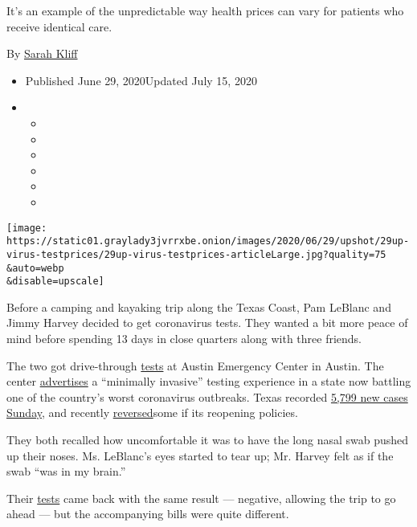 It's an example of the unpredictable way health prices can vary for
patients who receive identical care.

By \href{https://www.nytimes3xbfgragh.onion/by/sarah-kliff}{Sarah Kliff}

\begin{itemize}
\item
  Published June 29, 2020Updated July 15, 2020
\item
  \begin{itemize}
  \item
  \item
  \item
  \item
  \item
  \item
  \end{itemize}
\end{itemize}

\texttt{[image: https://static01.graylady3jvrrxbe.onion/images/2020/06/29/upshot/29up-virus-testprices/29up-virus-testprices-articleLarge.jpg?quality=75\\\&auto=webp\\\&disable=upscale]}

Before a camping and kayaking trip along the Texas Coast, Pam LeBlanc
and Jimmy Harvey decided to get coronavirus tests. They wanted a bit
more peace of mind before spending 13 days in close quarters along with
three friends.

The two got drive-through
\href{https://www.nytimes3xbfgragh.onion/2020/07/15/parenting/kids-covid-19-test.html}{tests}
at Austin Emergency Center in Austin. The center
\href{https://www.austinemergencycenters.net/covid}{advertises} a
``minimally invasive'' testing experience in a state now battling one of
the country's worst coronavirus outbreaks. Texas recorded
\href{https://www.nytimes3xbfgragh.onion/interactive/2020/us/texas-coronavirus-cases.html}{5,799
new cases Sunday}, and recently
\href{https://www.nytimes3xbfgragh.onion/2020/06/26/us/coronavirus-florida-texas-bars-closing.html}{reversed}some
if its reopening policies.

They both recalled how uncomfortable it was to have the long nasal swab
pushed up their noses. Ms. LeBlanc's eyes started to tear up; Mr. Harvey
felt as if the swab ``was in my brain.''

Their
\href{https://www.nytimes3xbfgragh.onion/2020/07/15/parenting/kids-covid-19-test.html}{tests}
came back with the same result --- negative, allowing the trip to go
ahead --- but the accompanying bills were quite different.

